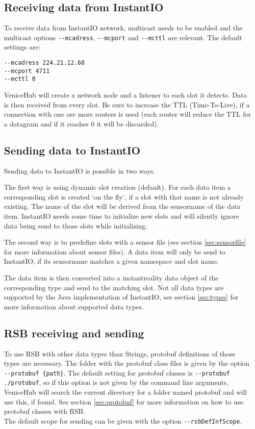 \documentclass[german,a4paper]{article}
\begin{document}
\subsection{Receiving data from InstantIO}
To receive data from InstantIO network, multicast needs to be enabled and the multicast options \texttt{-\--mcadress}, \texttt{-\--mcport} and \texttt{-\--mcttl} are relevant. The default settings are:
\begin{lstlisting}
--mcadress 224.21.12.68
--mcport 4711
--mcttl 0
\end{lstlisting}
VeniceHub will create a network node and a listener to each slot it detects. Data is then received from every slot. Be sure to increase the TTL (Time-To-Live), if a connection with one ore more routers is used (each router will reduce the TTL for a datagram and if it reaches 0 it will be discarded).

\subsection{Sending data to InstantIO}
Sending data to InstantIO is possible in two ways.

The first way is using dynamic slot creation (default). For each data item a corresponding slot is created `on the fly`, if a slot with that name is not already existing. The name of the slot will be derived from the sensorname of the data item. InstantIO needs some time to initialize new slots and will silently ignore data being send to those slots while initializing.

The second way is to predefine slots with a sensor file (see section \ref{sec:sensorfile} for more information about sensor files). A data item will only be send to InstantIO, if its sensorname matches a given namespace and slot name.

The data item is then converted into a instantreality data object of the corresponding type and send to the matching slot. Not all data types are supported by the Java implementation of InstantIO, see section \ref{sec:types} for more information about supported data types.

\subsection{RSB receiving and sending}
To use RSB with other data types than Strings, protobuf definitions of those types are necessary. The folder with the protobuf class files is given by the option \texttt{-\--protobuf \{path\}}. The default setting for protobuf classes is \texttt{-\--protobuf ./protobuf}, so if this option is not given by the command line arguments, VeniceHub will search the current directory for a folder named protobuf and will use this, if found. See section \ref{sec:protobuf} for more information on how to use protobuf classes with RSB.\\
The default scope for sending can be given with the option \texttt{-\--rsbDefInfScope}.\\
\end{document}
